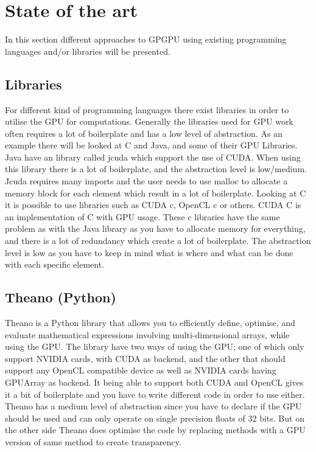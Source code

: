 \section{State of the art} %
\label{sec:state_of_the_art}
In this section different approaches to GPGPU using existing programming languages and/or libraries will be presented.
      
\subsection{Libraries} 
For different kind of programming languages there exist libraries in order to utilise the GPU for computations.
Generally the libraries used for GPU work often requires a lot of boilerplate and has a low level of abstraction.
As an example there will be looked at C and Java, and some of their GPU Libraries.
Java have an library called jcuda which support the use of CUDA.
When using this library there is a lot of boilerplate, and the abstraction level is low/medium\citep{Java_library}. 
Jcuda requires many imports and the user needs to use malloc to allocate a memory block for each element which result in a lot of boilerplate.\citep{Java_malloc}
Looking at C it is possible to use libraries such as CUDA c, OpenCL c or others.
CUDA C is an implementation of C with GPU usage.
These c libraries have the same problem as with the Java library as you have to allocate memory for everything, and there is a lot of redundancy which create a lot of boilerplate.
The abstraction level is low as you have to keep in mind what is where and what can be done with each specific element.\citep{C_CUDA}
                                                  

\subsection{Theano (Python)}
Theano is a Python library that allows you to efficiently define, optimise, and evaluate mathematical expressions involving multi-dimensional arrays, while using the GPU.
The library have two ways of using the GPU; one of which only support NVIDIA cards, with CUDA as backend, and the other that should support any OpenCL compatible device as well as NVIDIA cards having GPUArray as backend.
It being able to support both CUDA and OpenCL gives it a bit of boilerplate and you have to write different code in order to use either.
Theano has a medium level of abstraction since you have to declare if the GPU should be used and can only operate on single precision floats of 32 bits.
But on the other side Theano does optimise the code by replacing methods with a GPU version of same method to create transparency.\citep{Theano,Theano_GPU}

